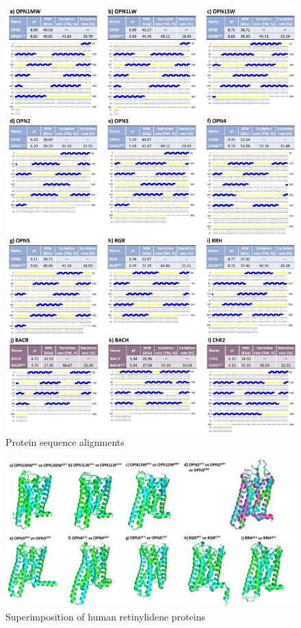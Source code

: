 \documentclass[fleqn,10pt,lineno]{manuscript}
\begin{document}
\begin{figure}[h]
	\centering
	\includegraphics[width=\linewidth]{Figures/sequences.jpg}
	\caption{Protein sequence alignments}
	\label{fig:sequences}
\end{figure}

\begin{figure}[h]
	\centering
	\includegraphics[width=\linewidth]{Figures/superimposition-human.jpg}
	\caption{Superimposition of human retinylidene proteins}
	\label{fig:humansup}
\end{figure}
\end{document}

